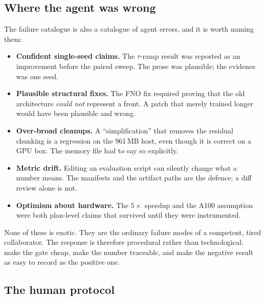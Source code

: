 \subsection{Where the agent was wrong}
\label{sec:agent-bad}

The failure catalogue is also a catalogue of agent errors, and it is worth
naming them:
\begin{itemize}
  \item \textbf{Confident single-seed claims.} The $\tau$-ramp result was reported as
        an improvement before the paired sweep. The prose was plausible; the
        evidence was one seed.
  \item \textbf{Plausible structural fixes.} The FNO fix required proving that
        the old architecture \emph{could not} represent a front. A patch that
        merely trained longer would have been plausible and wrong.
  \item \textbf{Over-broad cleanups.} A ``simplification'' that removes the
        residual chunking is a regression on the 961\,MB host, even though it is
        correct on a GPU box. The memory file had to say so explicitly.
  \item \textbf{Metric drift.} Editing an evaluation script can silently change
        what a number means. The manifests and the artifact paths are the
        defence; a diff review alone is not.
  \item \textbf{Optimism about hardware.} The $5\times$ speedup and the A100
        assumption were both plan-level claims that survived until they were
        instrumented.
\end{itemize}

None of these is exotic. They are the ordinary failure modes of a competent,
tired collaborator. The response is therefore procedural rather than
technological: make the gate cheap, make the number traceable, and make the
negative result as easy to record as the positive one.

\subsection{The human protocol}
\label{sec:protocol}

